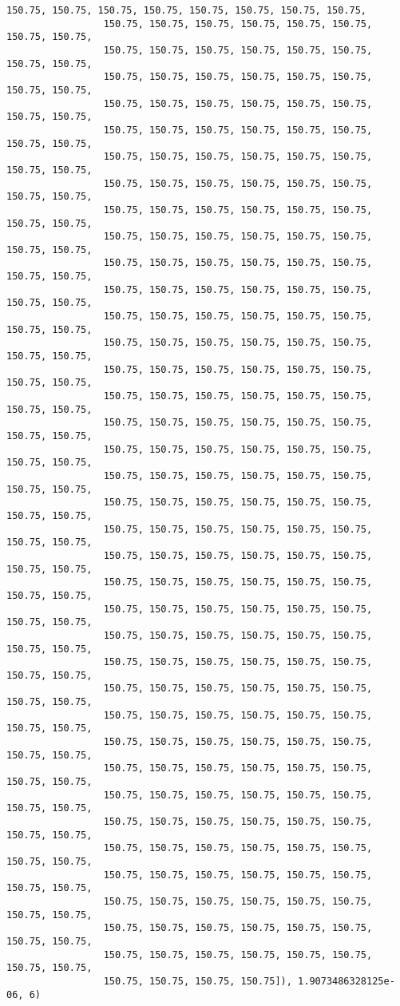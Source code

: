 \documentclass[11pt]{article}
\begin{document}
\begin{Verbatim}[commandchars=\\\{\}]
                 150.75, 150.75, 150.75, 150.75, 150.75, 150.75, 150.75, 150.75,
                 150.75, 150.75, 150.75, 150.75, 150.75, 150.75, 150.75, 150.75,
                 150.75, 150.75, 150.75, 150.75, 150.75, 150.75, 150.75, 150.75,
                 150.75, 150.75, 150.75, 150.75, 150.75, 150.75, 150.75, 150.75,
                 150.75, 150.75, 150.75, 150.75, 150.75, 150.75, 150.75, 150.75,
                 150.75, 150.75, 150.75, 150.75, 150.75, 150.75, 150.75, 150.75,
                 150.75, 150.75, 150.75, 150.75, 150.75, 150.75, 150.75, 150.75,
                 150.75, 150.75, 150.75, 150.75, 150.75, 150.75, 150.75, 150.75,
                 150.75, 150.75, 150.75, 150.75, 150.75, 150.75, 150.75, 150.75,
                 150.75, 150.75, 150.75, 150.75, 150.75, 150.75, 150.75, 150.75,
                 150.75, 150.75, 150.75, 150.75, 150.75, 150.75, 150.75, 150.75,
                 150.75, 150.75, 150.75, 150.75, 150.75, 150.75, 150.75, 150.75,
                 150.75, 150.75, 150.75, 150.75, 150.75, 150.75, 150.75, 150.75,
                 150.75, 150.75, 150.75, 150.75, 150.75, 150.75, 150.75, 150.75,
                 150.75, 150.75, 150.75, 150.75, 150.75, 150.75, 150.75, 150.75,
                 150.75, 150.75, 150.75, 150.75, 150.75, 150.75, 150.75, 150.75,
                 150.75, 150.75, 150.75, 150.75, 150.75, 150.75, 150.75, 150.75,
                 150.75, 150.75, 150.75, 150.75, 150.75, 150.75, 150.75, 150.75,
                 150.75, 150.75, 150.75, 150.75, 150.75, 150.75, 150.75, 150.75,
                 150.75, 150.75, 150.75, 150.75, 150.75, 150.75, 150.75, 150.75,
                 150.75, 150.75, 150.75, 150.75, 150.75, 150.75, 150.75, 150.75,
                 150.75, 150.75, 150.75, 150.75, 150.75, 150.75, 150.75, 150.75,
                 150.75, 150.75, 150.75, 150.75, 150.75, 150.75, 150.75, 150.75,
                 150.75, 150.75, 150.75, 150.75, 150.75, 150.75, 150.75, 150.75,
                 150.75, 150.75, 150.75, 150.75, 150.75, 150.75, 150.75, 150.75,
                 150.75, 150.75, 150.75, 150.75, 150.75, 150.75, 150.75, 150.75,
                 150.75, 150.75, 150.75, 150.75, 150.75, 150.75, 150.75, 150.75,
                 150.75, 150.75, 150.75, 150.75, 150.75, 150.75, 150.75, 150.75,
                 150.75, 150.75, 150.75, 150.75, 150.75, 150.75, 150.75, 150.75,
                 150.75, 150.75, 150.75, 150.75, 150.75, 150.75, 150.75, 150.75,
                 150.75, 150.75, 150.75, 150.75, 150.75, 150.75, 150.75, 150.75,
                 150.75, 150.75, 150.75, 150.75, 150.75, 150.75, 150.75, 150.75,
                 150.75, 150.75, 150.75, 150.75, 150.75, 150.75, 150.75, 150.75,
                 150.75, 150.75, 150.75, 150.75, 150.75, 150.75, 150.75, 150.75,
                 150.75, 150.75, 150.75, 150.75, 150.75, 150.75, 150.75, 150.75,
                 150.75, 150.75, 150.75, 150.75, 150.75, 150.75, 150.75, 150.75,
                 150.75, 150.75, 150.75, 150.75, 150.75, 150.75, 150.75, 150.75,
                 150.75, 150.75, 150.75, 150.75]), 1.9073486328125e-06, 6)
\end{Verbatim}
            
\end{document}
